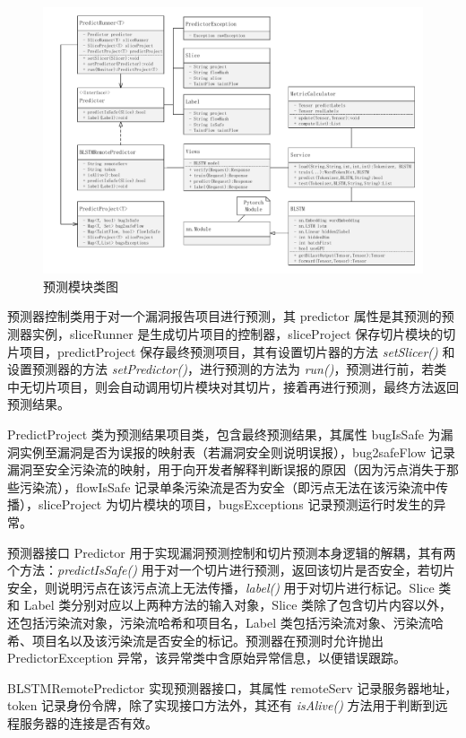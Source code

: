 \begin{figure}[!htbp]
    \centering
    \includegraphics[width=0.9\linewidth]{FIGs/chapter3/predictClass.pdf}
    \caption{预测模块类图}\label{predictClass}
\end{figure}

预测器控制类用于对一个漏洞报告项目进行预测，其 predictor 属性是其预测的预测器实例，sliceRunner 是生成切片项目的控制器，sliceProject 保存切片模块的切片项目，predictProject 保存最终预测项目，其有设置切片器的方法 \textit{setSlicer()} 和设置预测器的方法 \textit{setPredictor()}，进行预测的方法为 \textit{run()}，预测进行前，若类中无切片项目，则会自动调用切片模块对其切片，接着再进行预测，最终方法返回预测结果。

PredictProject 类为预测结果项目类，包含最终预测结果，其属性 bugIsSafe 为漏洞实例至漏洞是否为误报的映射表（若漏洞安全则说明误报），bug2safeFlow 记录漏洞至安全污染流的映射，用于向开发者解释判断误报的原因（因为污点消失于那些污染流），flowIsSafe 记录单条污染流是否为安全（即污点无法在该污染流中传播），sliceProject 为切片模块的项目，bugsExceptions 记录预测运行时发生的异常。

预测器接口 Predictor 用于实现漏洞预测控制和切片预测本身逻辑的解耦，其有两个方法：\textit{predictIsSafe()} 用于对一个切片进行预测，返回该切片是否安全，若切片安全，则说明污点在该污点流上无法传播，\textit{label()} 用于对切片进行标记。Slice 类和 Label 类分别对应以上两种方法的输入对象，Slice 类除了包含切片内容以外，还包括污染流对象，污染流哈希和项目名，Label 类包括污染流对象、污染流哈希、项目名以及该污染流是否安全的标记。预测器在预测时允许抛出 PredictorException 异常，该异常类中含原始异常信息，以便错误跟踪。

BLSTMRemotePredictor 实现预测器接口，其属性 remoteServ 记录服务器地址，token 记录身份令牌，除了实现接口方法外，其还有 \textit{isAlive()} 方法用于判断到远程服务器的连接是否有效。

